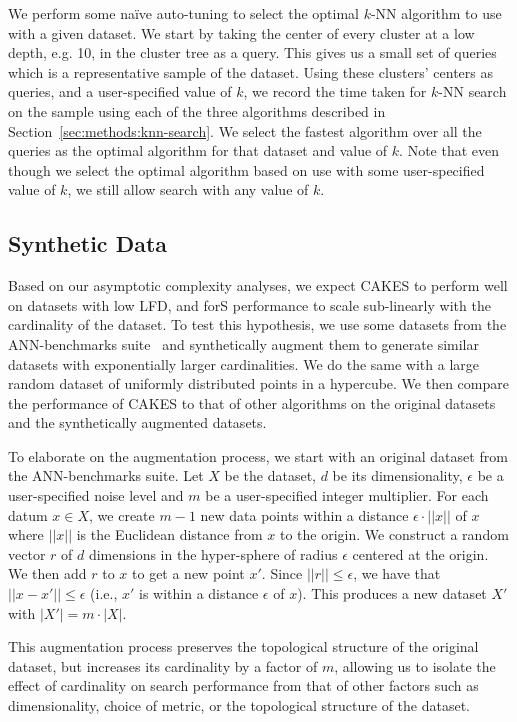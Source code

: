 We perform some na\"{i}ve auto-tuning to select the optimal $k$-NN algorithm to use with a given dataset.
We start by taking the center of every cluster at a low depth, e.g. 10, in the cluster tree as a query.
This gives us a small set of queries which is a representative sample of the dataset.
Using these clusters' centers as queries, and a user-specified value of $k$, we record the time taken for $k$-NN search on the sample using each of the three algorithms described in Section~\ref{sec:methods:knn-search}.
We select the fastest algorithm over all the queries as the optimal algorithm for that dataset and value of $k$.
Note that even though we select the optimal algorithm based on use with some user-specified value of $k$, we still allow search with any value of $k$.


\subsection{Synthetic Data}
\label{sec:methods:synthetic-data}

Based on our asymptotic complexity analyses, we expect CAKES to perform well on datasets with low LFD, and forS performance to scale sub-linearly with the cardinality of the dataset.
To test this hypothesis, we use some datasets from the ANN-benchmarks suite~\cite{aumuller2020ann} and synthetically augment them to generate similar datasets with exponentially larger cardinalities.
We do the same with a large random dataset of uniformly distributed points in a hypercube.
We then compare the performance of CAKES to that of other algorithms on the original datasets and the synthetically augmented datasets.

To elaborate on the augmentation process, we start with an original dataset from the ANN-benchmarks suite.
Let $X$ be the dataset, $d$ be its dimensionality, $\epsilon$ be a user-specified noise level and $m$ be a user-specified integer multiplier.
For each datum $x \in X$, we create $m - 1$ new data points within a distance $\epsilon \cdot ||x||$ of $x$ where $||x||$ is the Euclidean distance from $x$ to the origin.
We construct a random vector $r$ of $d$ dimensions in the hyper-sphere of radius $\epsilon$ centered at the origin.
We then add $r$ to $x$ to get a new point $x'$.
Since $||r|| \leq \epsilon$, we have that $||x - x'|| \leq \epsilon$ (i.e., $x'$ is within a distance $\epsilon$ of $x$).
This produces a new dataset $X'$ with $|X'| = m \cdot |X|$.

This augmentation process preserves the topological structure of the original dataset, but increases its cardinality by a factor of $m$, allowing us to isolate the effect of cardinality on search performance from that of other factors such as dimensionality, choice of metric, or the topological structure of the dataset.
